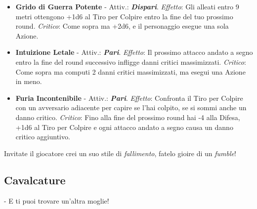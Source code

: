 \begin{multicols}{2}
\begin{itemize}[leftmargin=*]
\begin{itemize}[leftmargin=*]
		\item \textbf{Grido di Guerra Potente} - Attiv.: \textbf{\emph{Dispari}}. \emph{Effetto}: Gli alleati entro 9 metri ottengono +1d6 al Tiro per Colpire entro la fine del tuo prossimo round. \emph{Critico}: Come sopra ma +2d6, e il personaggio esegue una sola Azione.

		\item \textbf{Intuizione Letale} - Attiv.: \textbf{\emph{Pari}}. \emph{Effetto}: Il prossimo attacco andato a segno entro la fine del round successivo infligge danni critici massimizzati. \emph{Critico}: Come sopra ma computi 2 danni critici massimizzati, ma esegui una Azione in meno.

		\item \textbf{Furia Incontenibile} - Attiv.: \textbf{\emph{Pari}}. \emph{Effetto}: Confronta il Tiro per Colpire con un avversario adiacente per capire se l'hai colpito, se si sommi anche un danno critico. \emph{Critico}: Fino alla fine del prossimo round hai -4 alla Difesa, +1d6 al Tiro per Colpire e ogni attacco andato a segno causa un danno critico aggiuntivo.
	\end{itemize}

\end{itemize}

%
%


\begin{narratore}
		Invitate il giocatore crei un suo stile di \emph{fallimento}, fatelo gioire di un \emph{fumble}!
\end{narratore}


%

\subsection{Cavalcature}\label{cavalcature}\hypertarget{cavalcare}{}\label{cavalcare}

\begin{enfasi}{
- E ti puoi trovare un'altra moglie!

}
\end{enfasi}
\end{multicols}
